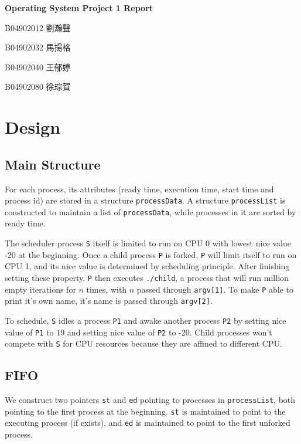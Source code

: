 \documentclass{article}
\begin{document}
\fontsize{12pt}{20pt}\selectfont
\begin{center}
	\bfseries\huge{Operating System Project 1 Report}\\
\end{center}
{
    \hfill B04902012 劉瀚聲

    \hfill B04902032 馬揚格

    \hfill B04902040 王郁婷

    \hfill B04902080 徐琮賀\\
}
\section{Design}
    \subsection{Main Structure}

        For each process, its attributes (ready time, execution time, start time and process id) are stored in a structure {\tt processData}.
        A structure {\tt processList} is constructed to maintain a list of {\tt processData}, while processes in it are sorted by ready time.

        The scheduler process {\tt S} itself is limited to run on CPU 0 with lowest nice value -20 at the beginning. Once a child process {\tt P} is forked, {\tt P} will limit itself to run on CPU 1, and its nice value is determined by scheduling principle. After finishing setting these property, {\tt P} then executes {\tt ./child}, a process that will run million empty iterations for \(n\) times, with \(n\) passed through {\tt argv[1]}. To make {\tt P} able to print it's own name, it's name is passed through {\tt argv[2]}.


        To schedule, {\tt S} idles a process {\tt P1} and awake another process {\tt P2} by setting nice value of {\tt P1}  to 19 and setting nice value of {\tt P2} to -20. Child processes won't compete with {\tt S} for CPU resources because they are affined to different CPU.
    
    \subsection{FIFO}
        We construct two pointers {\tt st} and {\tt ed} pointing to processes in {\tt processList}, both pointing to the first process at the beginning. {\tt st} is maintained to point to the executing process (if exists), and {\tt ed} is maintained to point to the first unforked process.
        
\end{document}
